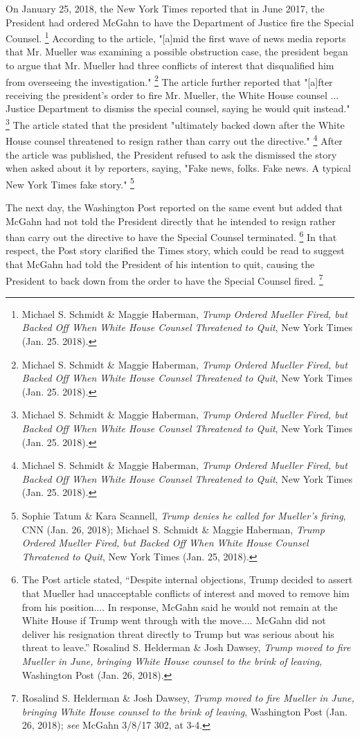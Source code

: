 On January 25, 2018, the New York Times reported that in June 2017, the President had ordered McGahn to have the Department of Justice fire the Special Counsel.%
\footnote{Michael S. Schmidt \& Maggie Haberman, \textit{Trump Ordered Mueller Fired, but Backed Off When White House Counsel Threatened to Quit}, New York Times (Jan. 25. 2018).}
According to the article, "[a]mid the first wave of news media reports that Mr. Mueller was examining a possible obstruction case, the president began to argue that Mr. Mueller had three conflicts of interest that disqualified him from overseeing the investigation."%
\footnote{Michael S. Schmidt \& Maggie Haberman, \textit{Trump Ordered Mueller Fired, but Backed Off When White House Counsel Threatened to Quit}, New York Times (Jan. 25. 2018).}
The article further reported that "[a]fter receiving the president's order to fire Mr. Mueller, the White House counsel ...
Justice Department to dismiss the special counsel, saying he would quit instead."%
\footnote{Michael S. Schmidt \& Maggie Haberman, \textit{Trump Ordered Mueller Fired, but Backed Off When White House Counsel Threatened to Quit}, New York Times (Jan. 25. 2018).}
The article stated that the president "ultimately backed down after the White House counsel threatened to resign rather than carry out the directive."%
\footnote{Michael S. Schmidt \& Maggie Haberman, \textit{Trump Ordered Mueller Fired, but Backed Off When White House Counsel Threatened to Quit}, New York Times (Jan. 25. 2018).}
After the article was published, the President
refused to ask the
dismissed the story when asked about it by reporters, saying, "Fake news, folks.
Fake news.
A typical New York Times fake story."%
\footnote{Sophie Tatum \& Kara Scannell, \textit{Trump denies he called for Mueller’s firing}, CNN (Jan. 26, 2018);
Michael S. Schmidt \& Maggie Haberman, \textit{Trump Ordered Mueller Fired, but Backed Off When White House Counsel Threatened to Quit}, New York Times (Jan. 25, 2018).}

The next day, the Washington Post reported on the same event but added that McGahn had not told the President directly that he intended to resign rather than carry out the directive to have the Special Counsel terminated.%
\footnote{The Post article stated, “Despite internal objections, Trump decided to assert that Mueller had unacceptable conflicts of interest and moved to remove him from his position....
In response, McGahn said he would not remain at the White House if Trump went through with the move....
McGahn did not deliver his resignation threat directly to Trump but was serious about his threat to leave.”
Rosalind S. Helderman \& Josh Dawsey, \textit{Trump moved to fire Mueller in June, bringing White House counsel to the brink of leaving}, Washington Post (Jan. 26, 2018).}
In that respect, the Post story clarified the Times story, which could be read to suggest that McGahn had told the President of his intention to quit, causing the President to back down from the order to have the Special Counsel fired.%
\footnote{Rosalind S. Helderman \& Josh Dawsey, \textit{Trump moved to fire Mueller in June, bringing White House counsel to the brink of leaving}, Washington Post (Jan. 26, 2018);
\textit{see} McGahn 3/8/17 302, at 3-4.}

